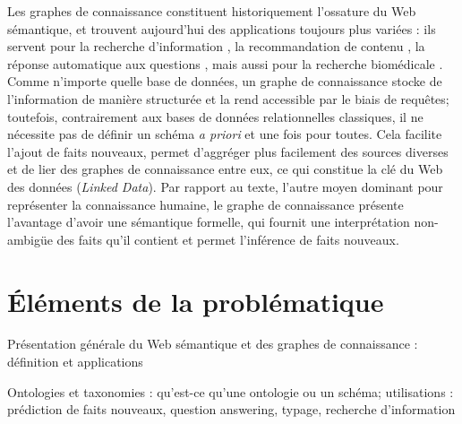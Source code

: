 \label{sec:Introduction}  %

Les graphes de connaissance constituent historiquement l'ossature du Web sémantique, et trouvent aujourd'hui des applications toujours plus variées : ils servent pour la recherche d'information \cite{bounhas2019building, dietz2018utilizing}, la recommandation de contenu \cite{ying2018graph, wang2018ripplenet, wang2019explainable}, la réponse automatique aux questions \cite{zhang2018variational, lukovnikov2017neural, saha2018complex}, mais aussi pour la recherche biomédicale \cite{bakal2018exploiting, sousa2020evolving}. Comme n'importe quelle base de données, un graphe de connaissance stocke de l'information de manière structurée et la rend accessible par le biais de requêtes; toutefois, contrairement aux bases de données relationnelles classiques, il ne nécessite pas de définir un schéma \textit{a priori} et une fois pour toutes. Cela facilite l'ajout de faits nouveaux, permet d'aggréger plus facilement des sources diverses et de lier des graphes de connaissance entre eux, ce qui constitue la clé du Web des données (\textit{Linked Data}).
Par rapport au texte, l'autre moyen dominant pour représenter la connaissance humaine, le graphe de connaissance présente l'avantage d'avoir une sémantique formelle, qui fournit une interprétation non-ambigüe des faits qu'il contient et permet l'inférence de faits nouveaux.




\clearpage

\section{Éléments de la problématique}  %




Présentation générale du Web sémantique et des graphes de connaissance : définition et applications

Ontologies et taxonomies : qu'est-ce qu'une ontologie ou un schéma; utilisations : prédiction de faits nouveaux, question answering, typage, recherche d'information

